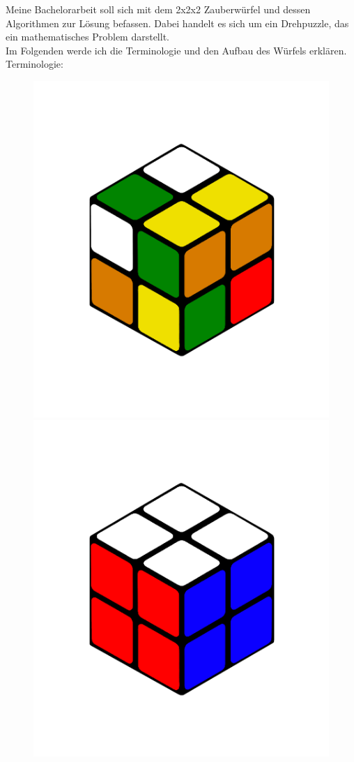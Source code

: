 \documentclass[12pt,a4paper, usenames, dvipsnames]{scrartcl}
\begin{document}
Meine Bachelorarbeit soll sich mit dem 2x2x2 Zauberwürfel und dessen Algorithmen zur Lösung befassen. Dabei handelt es sich um ein Drehpuzzle, das ein mathematisches Problem darstellt. \\ 
Im Folgenden werde ich die Terminologie und den Aufbau des Würfels erklären.\\
Terminologie:
\begin{figure}[h]
\centering
\includegraphics[scale=0.1]{2x2scrambled.png}
\includegraphics[scale=0.1]{2x2solved.png}

\end{figure}
\end{document}
